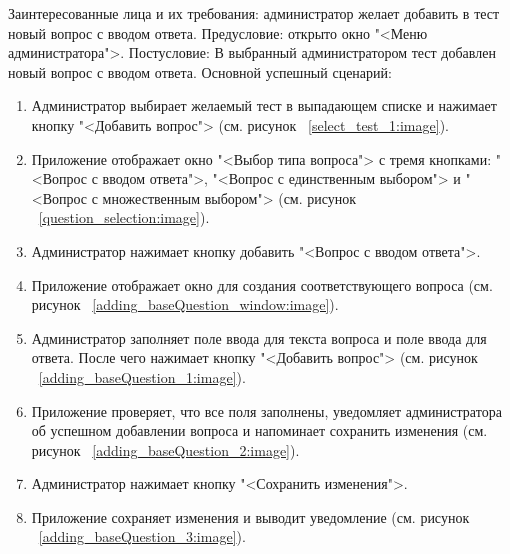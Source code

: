 Заинтересованные лица и их требования: администратор желает добавить в тест новый вопрос с вводом ответа.
\newline Предусловие: открыто окно "<Меню администратора">.
\newline Постусловие: В выбранный администратором тест добавлен новый вопрос с вводом ответа.
\newline Основной успешный сценарий:
\begin{enumerate}
	\item Администратор выбирает желаемый тест в выпадающем списке и нажимает кнопку "<Добавить вопрос"> (см. рисунок ~\ref{select_test_1:image}).
	\item Приложение отображает окно "<Выбор типа вопроса"> с тремя кнопками: "<Вопрос с вводом ответа">, "<Вопрос с единственным выбором"> и "<Вопрос с множественным выбором"> (см. рисунок ~\ref{question_selection:image}).
	\item Администратор нажимает кнопку добавить "<Вопрос с вводом ответа">.
	\item Приложение отображает окно для создания соответствующего вопроса (см. рисунок ~\ref{adding_baseQuestion_window:image}).
	\item Администратор заполняет поле ввода для текста вопроса и поле ввода для ответа. После чего нажимает кнопку "<Добавить вопрос"> (см. рисунок ~\ref{adding_baseQuestion_1:image}).
	\item Приложение проверяет, что все поля заполнены, уведомляет администратора об успешном добавлении вопроса и напоминает сохранить изменения (см. рисунок ~\ref{adding_baseQuestion_2:image}).
	\item Администратор нажимает кнопку "<Сохранить изменения">.
	\item Приложение сохраняет изменения и выводит уведомление (см. рисунок ~\ref{adding_baseQuestion_3:image}).
\end{enumerate}

